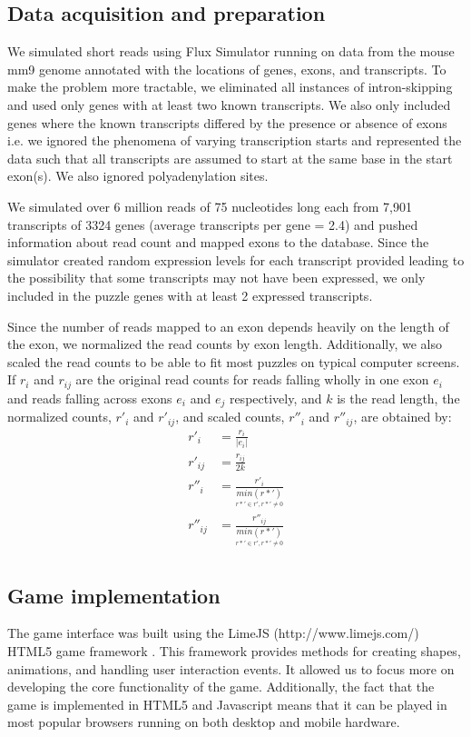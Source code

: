 \documentclass[12pt]{article}
\begin{document}
\subsection*{Data acquisition and preparation}
We simulated short reads using Flux Simulator \citep{sammeth2010flux} running on data from the mouse mm9 genome annotated with the locations of genes, exons, and transcripts. To make the problem more tractable, we eliminated all instances of intron-skipping and used only genes with at least two known transcripts. We also only included genes where the known transcripts differed by the presence or absence of exons i.e. we ignored the phenomena of varying transcription starts and represented the data such that all transcripts are assumed to start at the same base in the start exon(s). We also ignored polyadenylation sites. 

We simulated over 6 million reads of 75 nucleotides long each from 7,901 transcripts of 3324 genes (average transcripts per gene = 2.4) and pushed information about read count and mapped exons to the database. Since the simulator created random expression levels for each transcript provided leading to the possibility that some transcripts may not have been expressed, we only included in the puzzle genes with at least 2 expressed transcripts.

Since the number of reads mapped to an exon depends heavily on the length of the exon, we normalized the read counts by exon length. Additionally, we also scaled the read counts to be able to fit most puzzles on typical computer screens. If $r_i$ and $r_{ij}$ are the original read counts for reads falling wholly in one exon $e_i$ and reads falling across exons $e_i$ and $e_j$ respectively, and $k$ is the read length, the normalized counts,  $r'_i$ and $r'_{ij}$, and scaled counts, $r''_i$ and $r''_{ij}$, are obtained by:
\begin{align*}
r'_i &= \frac{r_i}{|e_i|} \\
r'_{ij} &= \frac{r_{ij}}{2k} \\
r''_i &= \frac{r'_i}{\underset{r*' \in r', r*' \not = 0}{min(r*')}} \\
r''_{ij} &= \frac{r''_{ij}}{\underset{r*' \in r', r*' \not = 0}{min(r*')}} \\
\end{align*}

\subsection*{Game implementation}
The game interface was built using the LimeJS (http://www.limejs.com/) HTML5 game framework . This framework provides methods for creating shapes,
animations, and handling user interaction events. It allowed us to focus more on developing the core functionality of the game.
Additionally, the fact that the game is implemented in HTML5 and Javascript means that it can be played in most popular browsers running on both desktop and mobile hardware.
\end{document}
